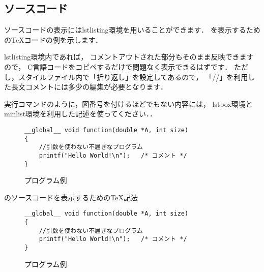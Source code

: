 \subsection{ソースコード}
ソースコードの表示にはlstlisting環境を用いることができます．
を表示するためのTeXコードの例を示します．

lstlisting環境内であれば，
コメントアウトされた部分もそのまま反映できますので，
C言語コードをコピペするだけで問題なく表示できるはずです．
ただし，スタイルファイル内で「折り返し」を設定してあるので，
「//」を利用した長文コメントには多少の編集が必要となります．

実行コマンドのように，図番号を付けるほどでもない内容には，
lstbox環境とminlist環境を利用した記述を使ってください．．
%
\begin{figure}[ht] 
\begin{lstlisting}
__global__ void function(double *A, int size)
{
	//引数を使わない不届きなプログラム 
	printf("Hello World!\n");	/* コメント */
}
\end{lstlisting}
\caption{プログラム例}
\label{fig:hello}
\end{figure} 
\begin{lstbox}{のソースコードを表示するためのTeX記法}
\begin{minilst}
\begin{figure}[ht] %
\begin{lstlisting}
__global__ void function(double *A, int size)
{
	//引数を使わない不届きなプログラム
	printf("Hello World!\n");	/* コメント */
}	
\end{lstlisting}
\caption{プログラム例}
\label{fig:hello}
\end{figure} %
\end{minilst}
\end{lstbox}
